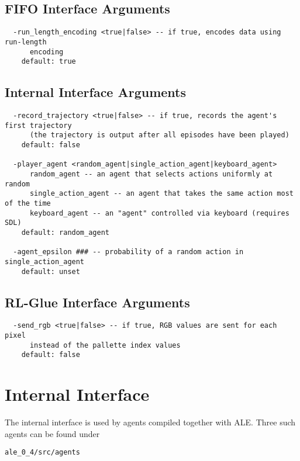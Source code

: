 \documentclass[12pt]{article}
\begin{document}
\subsection{FIFO Interface Arguments}

\small{
\begin{verbatim}
  -run_length_encoding <true|false> -- if true, encodes data using run-length
      encoding
    default: true
\end{verbatim}
}

\subsection{Internal Interface Arguments}

\small{
\begin{verbatim}
  -record_trajectory <true|false> -- if true, records the agent's first trajectory
      (the trajectory is output after all episodes have been played) 
    default: false

  -player_agent <random_agent|single_action_agent|keyboard_agent>
      random_agent -- an agent that selects actions uniformly at random
      single_action_agent -- an agent that takes the same action most of the time
      keyboard_agent -- an "agent" controlled via keyboard (requires SDL)
    default: random_agent

  -agent_epsilon ### -- probability of a random action in single_action_agent
    default: unset

\end{verbatim}
}

\subsection{RL-Glue Interface Arguments}

\small{
\begin{verbatim}
  -send_rgb <true|false> -- if true, RGB values are sent for each pixel
      instead of the pallette index values
    default: false
\end{verbatim}
}


\section{Internal Interface}\label{sec:internal_interface}

The internal interface is used by agents compiled together with ALE. Three such agents
can be found under 

\begin{verbatim}
ale_0_4/src/agents
\end{verbatim}
\end{document}
